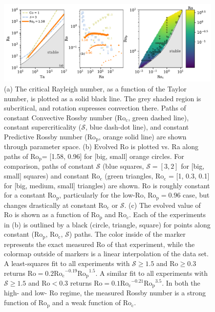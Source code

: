 \documentclass[twocolumn, amsmath, amsfonts, amssymb, trackchanges]{aastex62}
\newcommand{\pro}{\ensuremath{\text{Ro}_{\text{p}}}}
\newcommand{\con}{\ensuremath{\text{Ro}_{\text{c}}}}
\begin{document}
\begin{figure}[t!]
    \includegraphics[width=\textwidth]{parameter_space.pdf}
    \caption{(a) The critical Rayleigh number, as a function of the Taylor number, 
    is plotted as a solid black line. The grey shaded region is subcritical, and rotation
    supresses convection there. Paths of constant Convective Rossby number
    ($\con$, green dashed line), constant supercriticality ($\mathcal{S}$, blue dash-dot line), and 
    constant Predictive Rossby number (\pro, orange solid line) are shown through parameter space. 
    (b) Evolved Ro is plotted vs. Ra along paths of \pro = [1.58, 0.96] for [big, small] orange circles.
    For comparison, paths of constant $\mathcal{S}$ (blue squares, $\mathcal{S} = [3,2]$ 
    for [big, small] squares)
    and constant $\con$ (green triangles, $\con$ = [1, 0.3, 0.1] for [big, medium, small] triangles) are shown.
    Ro is roughly constant for a constant \pro, particularly for the low-Ro, $\pro=0.96$ case, 
    but changes drastically at constant $\con$ or $\mathcal{S}$.
    (c) The evolved value of Ro is shown as a function of $\pro$ and $\con$. 
	Each of the experiments in (b) is outlined by a black (circle, triangle, square)
	for points along constant (\pro, \con, $\mathcal{S}$) paths.
	The color inside of the marker represents the exact measured Ro of that experiment, 
	while the colormap outside of markers is a linear interpolation
	of the data set. A least-squares fit to all experiments with $\mathcal{S} \geq 1.5$ and
	$\text{Ro} \geq 0.3$ returns $\text{Ro} = 0.2 \con^{-0.19}\pro^{1.5}$. A similar fit to all experiments with
	$\mathcal{S} \geq 1.5$ and $\text{Ro} < 0.3$ returns $\text{Ro} = 0.1 \con^{-0.21}\pro^{3.5}$. 
	In both the high- and low- Ro regime, the measured
	Rossby number is a strong function of $\pro$ and a weak function of $\con$.
    \label{fig:parameter_space} }
\end{figure}
\end{document}

